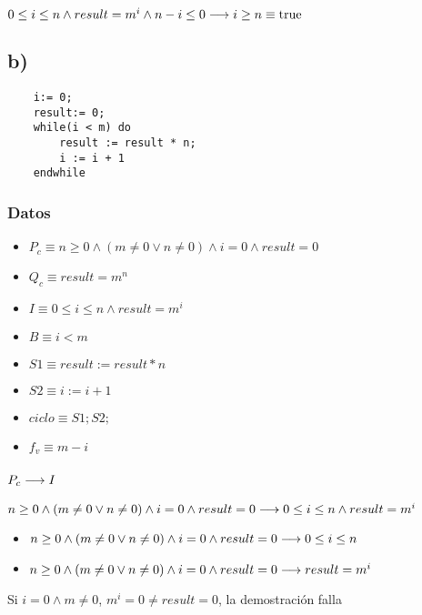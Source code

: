 \documentclass{article}
\begin{document}
$0 \leq i \leq n \wedge result = m^{i} \wedge n-i \leq 0 \longrightarrow i \geq n \equiv \mathrm{true}$

\subsection*{b)}

\begin{verbatim}
    i:= 0;
    result:= 0;
    while(i < m) do
        result := result * n;
        i := i + 1
    endwhile
\end{verbatim}

\subsubsection*{Datos}
\begin{itemize}
    \item $P_{c}    \equiv n \geq 0 \wedge (m \neq 0 \vee n \neq 0) \wedge i = 0 \wedge result = 0$
    \item $Q_{c}    \equiv result = m^{n}$
    \item $I        \equiv 0 \leq i \leq n \wedge result = m^{i}$
    \item $B        \equiv i < m$
    \item $S1       \equiv result := result * n$
    \item $S2       \equiv i := i + 1$
    \item $ciclo    \equiv S1;S2;$
    \item $f_{v}    \equiv m-i$
\end{itemize}

\subsubsection*{$P_{c} \longrightarrow I$}

    $n \geq 0 \wedge (m \neq 0 \vee n \neq 0) \wedge i = 0 \wedge result = 0 \longrightarrow 0 \leq i \leq n \wedge result = m^{i}$

    \begin{itemize}
        \item $n \geq 0 \wedge (m \neq 0 \vee n \neq 0) \wedge i = 0 \wedge result = 0 \longrightarrow 0 \leq i \leq n$
        \item $n \geq 0 \wedge (m \neq 0 \vee n \neq 0) \wedge i = 0 \wedge result = 0 \longrightarrow result = m^{i}$
    \end{itemize}

    Si $i=0 \wedge m \neq 0$, $m^{i} = 0 \neq result = 0$, la demostración falla
\end{document}
